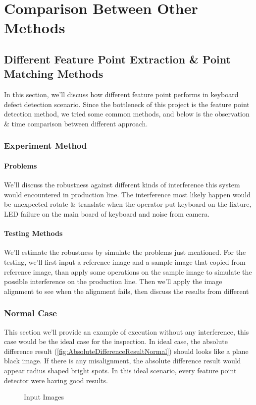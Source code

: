 \chapter{Comparison Between Other Methods}
\label{c:comparision}

\section{Different Feature Point Extraction \& Point Matching Methods}
	In this section, we'll discuss how different feature point performs in keyboard defect detection scenario.
	Since the bottleneck of this project is the feature point detection method, we tried some common methods, and below is the observation \& time comparison between different approach.
	\subsection{Experiment Method}
		\subsubsection{Problems}
			We'll discuss the robustness against different kinds of interference this system would encountered in production line.
			The interference most likely happen would be 
			unexpected rotate \& translate when the operator put keyboard on the fixture, 
			LED failure on the main board of keyboard and noise from camera.
		\subsubsection{Testing Methods}
			We'll estimate the robustness by simulate the problems just mentioned. 
			For the testing, we'll first input a reference image and a sample image that copied from reference image, 
			than apply some operations on the sample image to simulate the possible interference on the production line.
			Then we'll apply the image alignment to see when the alignment fails, then discuss the results from different \\
	\subsection{Normal Case}
		This section we'll provide an example of execution without any interference, this case would be the ideal case for the inspection.
		In ideal case, the absolute difference result (\ref{fig:AbsoluteDifferenceResultNormal}) should looks like a plane black image. If there is any misalignment, the absolute difference result would appear radius shaped bright spots.
		In this ideal scenario, every feature point detector were having good results.
		\begin{figure}[H]
			\caption{Input Images}
			\label{fig:RawImages}
		\end{figure}

